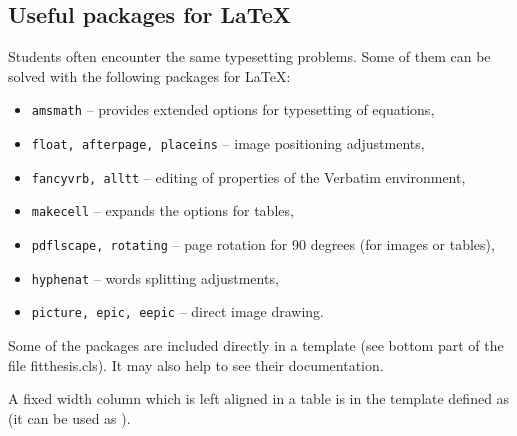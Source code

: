 \subsection*{Useful packages for \LaTeX}

Students often encounter the same typesetting problems. Some of them can be solved with the following packages for \LaTeX:

\begin{itemize}
  \item \verb|amsmath| -- provides extended options for typesetting of equations,
  \item \verb|float, afterpage, placeins| -- image positioning adjustments,
  \item \verb|fancyvrb, alltt| -- editing of properties of the Verbatim environment,
  \item \verb|makecell| -- expands the options for tables,
  \item \verb|pdflscape, rotating| -- page rotation for 90 degrees (for images or tables),
  \item \verb|hyphenat| -- words splitting adjustments,
  \item \verb|picture, epic, eepic| -- direct image drawing.
\end{itemize}

Some of the packages are included directly in a template (see bottom part of the file fitthesis.cls). It may also help to see their documentation.

A fixed width column which is left aligned in a table is in the template defined as  (it can be used as ).

